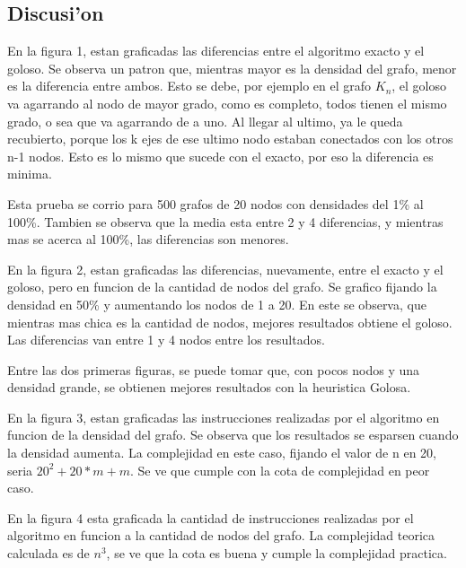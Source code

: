 \subsection{Discusi'on}

En la figura 1, estan graficadas las diferencias entre el algoritmo exacto y el goloso. Se observa un patron que, mientras mayor es la densidad del grafo, menor es la diferencia entre ambos. Esto se debe, por ejemplo en el grafo $K_n$, el goloso va agarrando al nodo de mayor grado, como es completo, todos tienen el mismo grado, o sea que va agarrando de a uno. Al llegar al ultimo, ya le queda recubierto, porque los k ejes de ese ultimo nodo estaban conectados con los otros n-1 nodos. Esto es lo mismo que sucede con el exacto, por eso la diferencia es minima.


Esta prueba se corrio para 500 grafos de 20 nodos con densidades del 1\% al 100\%. Tambien se observa que la media esta entre 2 y 4 diferencias, y mientras mas se acerca al 100\%, las diferencias son menores.


En la figura 2, estan graficadas las diferencias, nuevamente, entre el exacto y el goloso, pero en funcion de la cantidad de nodos del grafo. Se grafico fijando la densidad en 50\% y aumentando los nodos de 1 a 20. En este se observa, que mientras mas chica es la cantidad de nodos, mejores resultados obtiene el goloso. Las diferencias van entre 1 y 4 nodos entre los resultados.


Entre las dos primeras figuras, se puede tomar que, con pocos nodos y una densidad grande, se obtienen mejores resultados con la heuristica Golosa.


En la figura 3, estan graficadas las instrucciones realizadas por el algoritmo en funcion de la densidad del grafo. Se observa que los resultados se esparsen cuando la densidad aumenta. La complejidad en este caso, fijando el valor de n en 20, seria $20^2+20*m+m$. Se ve que cumple con la cota de complejidad en peor caso.


En la figura 4 esta graficada la cantidad de instrucciones realizadas por el algoritmo en funcion a la cantidad de nodos del grafo. La complejidad teorica calculada es de $n^3$, se ve que la cota es buena y cumple la complejidad practica.
